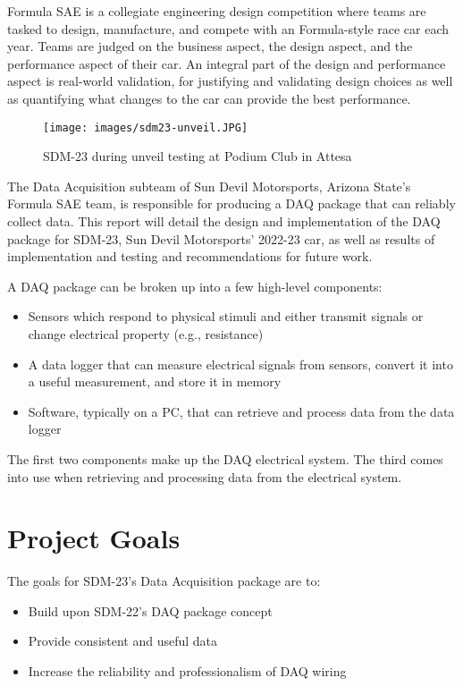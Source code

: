Formula SAE is a collegiate engineering design competition where teams are tasked to design, manufacture, and compete with an Formula-style race car each year.
Teams are judged on the business aspect, the design aspect, and the performance aspect of their car.
An integral part of the design and performance aspect is real-world validation, for justifying and validating design choices as well as quantifying what changes to the car can provide the best performance.
\begin{figure}[H]
    \centering
    \texttt{[image: images/sdm23-unveil.JPG]}
    \caption{SDM-23 during unveil testing at Podium Club in Attesa}
    \label{fig:sdm23-unveil}
\end{figure}

The Data Acquisition subteam of Sun Devil Motorsports, Arizona State's Formula SAE team, is responsible for producing a DAQ package that can reliably collect data.
This report will detail the design and implementation of the DAQ package for SDM-23, Sun Devil Motorsports' 2022-23 car, as well as results of implementation and testing and recommendations for future work.
\vspace{1em}

A DAQ package can be broken up into a few high-level components:
\begin{itemize}
    \item Sensors which respond to physical stimuli and either transmit signals or change electrical property (e.g., resistance)
    \item A data logger that can measure electrical signals from sensors, convert it into a useful measurement, and store it in memory
    \item Software, typically on a PC, that can retrieve and process data from the data logger
\end{itemize}
The first two components make up the DAQ electrical system.
The third comes into use when retrieving and processing data from the electrical system.
\section{Project Goals}
The goals for SDM-23's Data Acquisition package are to:
\begin{itemize}
    \item Build upon SDM-22's DAQ package concept
    \item Provide consistent and useful data
    \item Increase the reliability and professionalism of DAQ wiring
\end{itemize}

